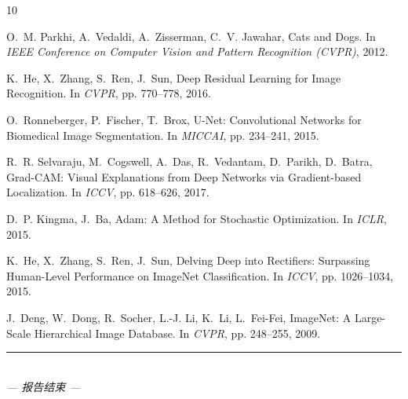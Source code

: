 \documentclass[12pt, a4paper, openany]{ctexbook}
\begin{document}
\begin{thebibliography}{10}

O.~M. Parkhi, A.~Vedaldi, A.~Zisserman, C.~V. Jawahar,
\newblock Cats and Dogs.
\newblock In \emph{IEEE Conference on Computer Vision and Pattern Recognition
  (CVPR)}, 2012.

K.~He, X.~Zhang, S.~Ren, J.~Sun,
\newblock Deep Residual Learning for Image Recognition.
\newblock In \emph{CVPR}, pp. 770--778, 2016.

O.~Ronneberger, P.~Fischer, T.~Brox,
\newblock U-Net: Convolutional Networks for Biomedical Image Segmentation.
\newblock In \emph{MICCAI}, pp. 234--241, 2015.

R.~R. Selvaraju, M.~Cogswell, A.~Das, R.~Vedantam, D.~Parikh, D.~Batra,
\newblock Grad-CAM: Visual Explanations from Deep Networks via Gradient-based
  Localization.
\newblock In \emph{ICCV}, pp. 618--626, 2017.

D.~P. Kingma, J.~Ba,
\newblock Adam: A Method for Stochastic Optimization.
\newblock In \emph{ICLR}, 2015.

K.~He, X.~Zhang, S.~Ren, J.~Sun,
\newblock Delving Deep into Rectifiers: Surpassing Human-Level Performance on
  ImageNet Classification.
\newblock In \emph{ICCV}, pp. 1026--1034, 2015.

J.~Deng, W.~Dong, R.~Socher, L.-J. Li, K.~Li, L.~Fei-Fei,
\newblock ImageNet: A Large-Scale Hierarchical Image Database.
\newblock In \emph{CVPR}, pp. 248--255, 2009.

\end{thebibliography}

\vspace{2cm}
\begin{center}
\rule{0.5\linewidth}{0.4pt}\\[0.5cm]
{\itshape — 报告结束 —}
\end{center}
\end{document}
